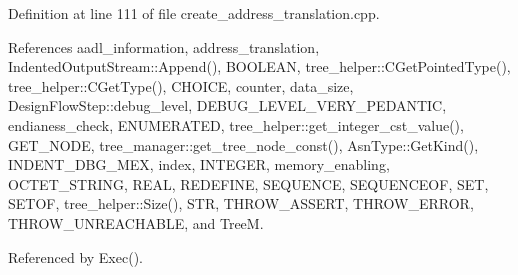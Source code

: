 Definition at line 111 of file create\+\_\+address\+\_\+translation.\+cpp.



References aadl\+\_\+information, address\+\_\+translation, Indented\+Output\+Stream\+::\+Append(), B\+O\+O\+L\+E\+AN, tree\+\_\+helper\+::\+C\+Get\+Pointed\+Type(), tree\+\_\+helper\+::\+C\+Get\+Type(), C\+H\+O\+I\+CE, counter, data\+\_\+size, Design\+Flow\+Step\+::debug\+\_\+level, D\+E\+B\+U\+G\+\_\+\+L\+E\+V\+E\+L\+\_\+\+V\+E\+R\+Y\+\_\+\+P\+E\+D\+A\+N\+T\+IC, endianess\+\_\+check, E\+N\+U\+M\+E\+R\+A\+T\+ED, tree\+\_\+helper\+::get\+\_\+integer\+\_\+cst\+\_\+value(), G\+E\+T\+\_\+\+N\+O\+DE, tree\+\_\+manager\+::get\+\_\+tree\+\_\+node\+\_\+const(), Asn\+Type\+::\+Get\+Kind(), I\+N\+D\+E\+N\+T\+\_\+\+D\+B\+G\+\_\+\+M\+EX, index, I\+N\+T\+E\+G\+ER, memory\+\_\+enabling, O\+C\+T\+E\+T\+\_\+\+S\+T\+R\+I\+NG, R\+E\+AL, R\+E\+D\+E\+F\+I\+NE, S\+E\+Q\+U\+E\+N\+CE, S\+E\+Q\+U\+E\+N\+C\+E\+OF, S\+ET, S\+E\+T\+OF, tree\+\_\+helper\+::\+Size(), S\+TR, T\+H\+R\+O\+W\+\_\+\+A\+S\+S\+E\+RT, T\+H\+R\+O\+W\+\_\+\+E\+R\+R\+OR, T\+H\+R\+O\+W\+\_\+\+U\+N\+R\+E\+A\+C\+H\+A\+B\+LE, and TreeM.



Referenced by Exec().

